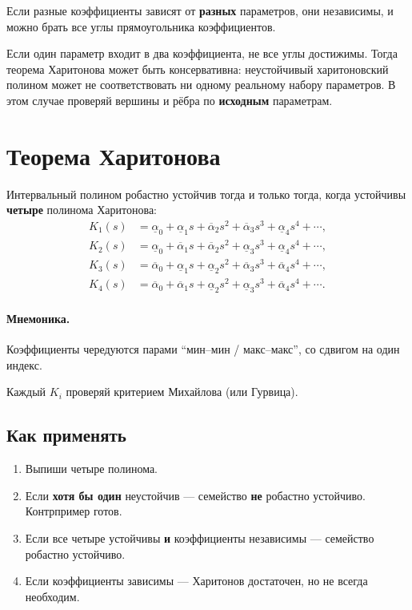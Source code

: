 \documentclass[11pt,a4paper]{article}
\begin{document}
Если разные коэффициенты зависят от \textbf{разных} параметров, они независимы,
и можно брать все углы прямоугольника коэффициентов.

Если один параметр входит в два коэффициента, не все углы достижимы.
Тогда теорема Харитонова может быть консервативна: неустойчивый харитоновский полином
может не соответствовать ни одному реальному набору параметров.
В этом случае проверяй вершины и рёбра по \textbf{исходным} параметрам.

\section{Теорема Харитонова}

Интервальный полином робастно устойчив тогда и только тогда, когда устойчивы
\textbf{четыре} полинома Харитонова:
\begin{align*}
K_1(s)&=\underline{\alpha}_0+\underline{\alpha}_1 s+\overline{\alpha}_2 s^2+\overline{\alpha}_3 s^3+\underline{\alpha}_4 s^4+\cdots,\\
K_2(s)&=\underline{\alpha}_0+\overline{\alpha}_1 s+\overline{\alpha}_2 s^2+\underline{\alpha}_3 s^3+\underline{\alpha}_4 s^4+\cdots,\\
K_3(s)&=\overline{\alpha}_0+\underline{\alpha}_1 s+\underline{\alpha}_2 s^2+\overline{\alpha}_3 s^3+\overline{\alpha}_4 s^4+\cdots,\\
K_4(s)&=\overline{\alpha}_0+\overline{\alpha}_1 s+\underline{\alpha}_2 s^2+\underline{\alpha}_3 s^3+\overline{\alpha}_4 s^4+\cdots.
\end{align*}

\paragraph{Мнемоника.}
Коэффициенты чередуются парами ``мин--мин / макс--макс'', со сдвигом на один индекс.

Каждый \(K_i\) проверяй критерием Михайлова (или Гурвица).

\subsection{Как применять}

\begin{enumerate}
  \item Выпиши четыре полинома.
  \item Если \textbf{хотя бы один} неустойчив --- семейство \textbf{не} робастно устойчиво.
        Контрпример готов.
  \item Если все четыре устойчивы \textbf{и} коэффициенты независимы ---
        семейство робастно устойчиво.
  \item Если коэффициенты зависимы --- Харитонов достаточен, но не всегда необходим.
\end{enumerate}
\end{document}
